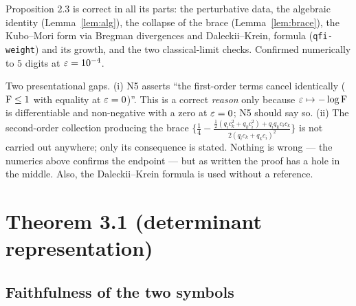 \documentclass[11pt]{article}
\begin{document}
\begin{verdictok}
Proposition 2.3 is correct in all its parts: the perturbative data, the algebraic identity
(Lemma~\ref{lem:alg}), the collapse of the brace (Lemma~\ref{lem:brace}), the Kubo--Mori form via
Bregman divergences and Daleckii--Krein, formula (\texttt{qfi-weight}) and its growth, and the two
classical-limit checks.  Confirmed numerically to $5$ digits at $\varepsilon=10^{-4}$.
\end{verdictok}
\begin{verdictgap}
Two presentational gaps.  (i) N5 asserts ``the first-order terms cancel identically ($\operatorname{F}\le1$
with equality at $\varepsilon=0$)''.  This is a correct \emph{reason} only because $\varepsilon\mapsto-\log\operatorname{F}$
is differentiable and non-negative with a zero at $\varepsilon=0$; N5 should say so.  (ii) The
second-order collection producing the brace
$\{\tfrac14-\frac{\frac12(q_ic_k^2+q_kc_i^2)+q_iq_kc_ic_k}{2(q_ic_k+q_kc_i)^2}\}$ is not carried
out anywhere; only its consequence is stated.  Nothing is wrong --- the numerics above confirms
the endpoint --- but as written the proof has a hole in the middle.  Also, the Daleckii--Krein
formula is used without a reference.
\end{verdictgap}

\section{Theorem 3.1 (determinant representation)}\label{sec:detrep}

\subsection{Faithfulness of the two symbols}
\end{document}
